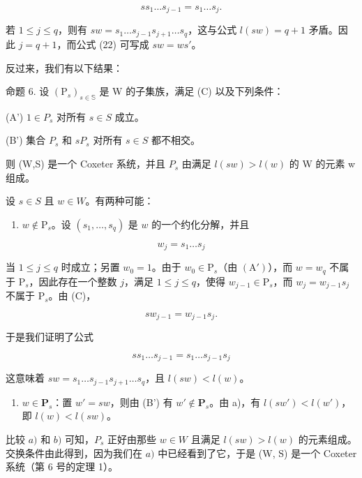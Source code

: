 \[
s s _ {1} \dots s _ {j - 1} = s _ {1} \dots s _ {j}.\tag{22}
\]

若 \(1 \leqslant j \leqslant q\)，则有 \(sw = s_1 \ldots s_{j-1}s_{j+1} \ldots s_q\)，这与公式 \(l(sw) = q + 1\) 矛盾。因此 \(j = q + 1\)，而公式 (22) 可写成 \(sw = ws'\)。

反过来，我们有以下结果：

命题 6. 设 \((\mathrm{P}_s)_{s\in \mathbb{S}}\) 是 W 的子集族，满足 (C) 以及下列条件：

(A') \(1 \in P_{s}\) 对所有 \(s \in S\) 成立。

(B') 集合 \(P_{s}\) 和 \(sP_{s}\) 对所有 \(s \in S\) 都不相交。

则 (W,S) 是一个 Coxeter 系统，并且 \(P_{s}\) 由满足 \(l(sw) > l(w)\) 的 W 的元素 w 组成。

设 \(s \in S\) 且 \(w \in W\)。有两种可能：

\begin{enumerate}
\def\labelenumi{\alph{enumi})}
\tightlist
\item
  \(w \notin \mathrm{P}_s\)。设 \((s_1, \ldots, s_q)\) 是 \(w\) 的一个约化分解，并且
\end{enumerate}

\[
w _ {j} = s _ {1} \dots s _ {j}
\]

当 \(1 \leqslant j \leqslant q\) 时成立；另置 \(w_0 = 1\)。由于 \(w_0 \in \mathrm{P}_s\)（由 \((\mathrm{A}')\)），而 \(w = w_q\) 不属于 \(\mathrm{P}_s\)，因此存在一个整数 \(j\)，满足 \(1 \leqslant j \leqslant q\)，使得 \(w_{j-1} \in \mathrm{P}_s\)，而 \(w_j = w_{j-1}s_j\) 不属于 \(\mathrm{P}_s\)。由 (C)，

\[
s w _ {j - 1} = w _ {j - 1} s _ {j}.
\]

于是我们证明了公式

\[
s s _ {1} \dots s _ {j - 1} = s _ {1} \dots s _ {j - 1} s _ {j}
\]

这意味着 \(sw = s_1 \ldots s_{j-1}s_{j+1} \ldots s_q\)，且 \(l(sw) < l(w)\)。

\begin{enumerate}
\def\labelenumi{\alph{enumi})}
\setcounter{enumi}{1}
\tightlist
\item
  \(w \in \mathbf{P}_s\)：置 \(w' = sw\)，则由 (B') 有 \(w' \notin \mathbf{P}_s\)。由 a)，有 \(l(sw') < l(w')\)，即 \(l(w) < l(sw)\)。
\end{enumerate}

比较 \(a)\) 和 \(b)\) 可知，\(P_s\) 正好由那些 \(w \in W\) 且满足 \(l(sw) > l(w)\) 的元素组成。交换条件由此得到，因为我们在 \(a)\) 中已经看到了它，于是 (W, S) 是一个 Coxeter 系统（第 6 号的定理 1）。

